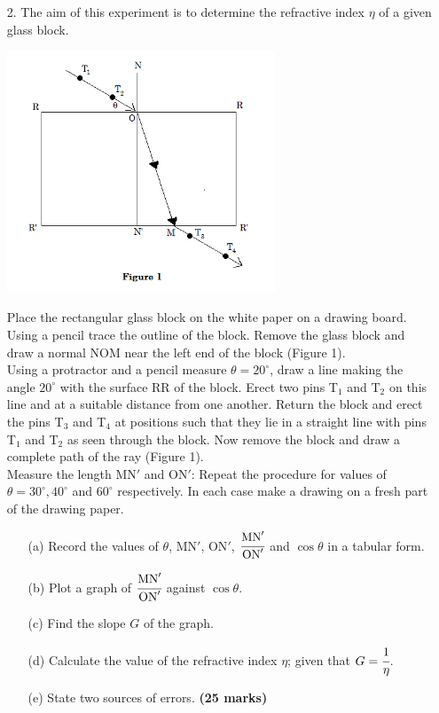 \begin{enumerate}
\item[2.] The aim of this experiment is to determine the refractive index $\eta$ of a given glass block.

\begin{center}
\includegraphics[width=8cm]{./img/2009-2-alt.png}
\end{center}

Place the rectangular glass block on the white paper on a drawing board. Using a pencil trace the outline of the block. Remove the glass block and draw a normal NOM near the left end of the block (Figure 1).\\[10pt]

\noindent Using a protractor and a pencil measure $\theta = 20^\circ$, draw a line making the angle $20^\circ$ with the surface RR of the block. Erect two pins T$_1$ and T$_2$ on this line and at a suitable distance from one another. Return the block and erect the pins T$_3$ and T$_4$ at positions such that they lie in a straight line with pins T$_1$ and T$_2$ as seen through the block. Now remove the block and draw a complete path of the ray (Figure 1).\\[10pt]

\noindent Measure the length MN$'$ and ON$'$: Repeat the procedure for values of $\theta = 30^\circ, 40^\circ$ and $60^\circ$ respectively. In each case make a drawing on a fresh part of the drawing paper.

\begin{itemize}
\item[(a)] Record the values of $\theta$, MN$'$, ON$'$, $\cfrac{\text{MN}'}{\text{ON}'}$ and $\cos \theta$ in a tabular form.
\item[(b)] Plot a graph of $\cfrac{\text{MN}'}{\text{ON}'}$ against $\cos \theta$.
\item[(c)] Find the slope $G$ of the graph.
\item[(d)] Calculate the value of the refractive index $\eta$; given that $G = \cfrac{1}{\eta}$.
\item[(e)] State two sources of errors. \hfill \textbf{(25 marks)}
\end{itemize}

\end{enumerate}


